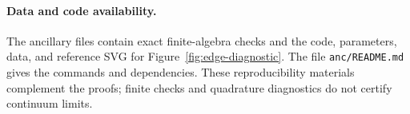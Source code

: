 \paragraph{Data and code availability.}
The ancillary files contain exact finite-algebra checks and the code,
parameters, data, and reference SVG for Figure~\ref{fig:edge-diagnostic}.
The file \texttt{anc/README.md} gives the commands and dependencies.
These reproducibility materials complement the proofs; finite checks
and quadrature diagnostics do not certify continuum limits.
